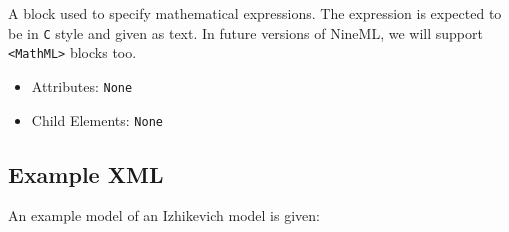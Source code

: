 \documentclass{article}
\begin{document}
A block used to specify mathematical expressions. The expression is expected to
be in \texttt{C} style and given as text. In future versions of NineML, we will
support \verb|<MathML>| blocks too.

\begin{itemize}
\item Attributes:  \texttt{None}

\item Child Elements: \texttt{None}
\end{itemize}

\pagebreak

\subsection{Example XML}

An example model of an Izhikevich model is given:
%
\end{document}
